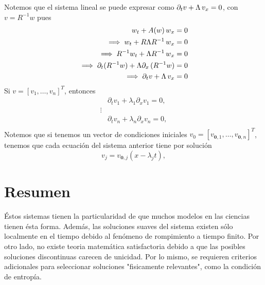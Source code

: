 Notemos que el sistema lineal se puede expresar como $\partial_t v + \Lambda \thinspace v_x = 0$, con $v = R^{-1} w$ pues
\begin{align*}
w_t + A(w) \thinspace w_x &= 0 \\
\implies w_t + R \Lambda R^{-1} \thinspace w_x &= 0 \\
\implies R^{-1} w_t + \Lambda R^{-1} \thinspace w_x &= 0 \\
\implies \partial_t(R^{-1} w) + \Lambda \partial_x \thinspace ( R^{-1} w) &= 0 \\
\implies \partial_t v + \Lambda \thinspace v_x &= 0
\end{align*}
Si $v = [v_1, \dots, v_n]^T $, entonces
\begin{align*}
&\partial_t v_1 + \lambda_1 \partial_x v_1 = 0, \\
\vdots \\
&\partial_t v_n + \lambda_n \partial_x v_n = 0, \\
\end{align*}
Notemos que si tenemos un vector de condiciones iniciales $v_0 = [v_{\textbf{0},1}, \dots, v_{\textbf{0},n}]^T$, tenemos que cada ecuación del sistema anterior tiene por solución
\[
v_j = v_{\textbf{0},j} (x - \lambda_j t),
\]


\section{Resumen}
Éstos sistemas tienen la particularidad de que muchos modelos en las ciencias tienen ésta forma. Además, las soluciones suaves del sistema existen sólo localmente en el tiempo debido al fenómeno de rompimiento a tiempo finito. Por otro lado, no existe teoria matemática satisfactoria debido a que las posibles soluciones discontinuas carecen de unicidad. Por lo mismo, se requieren criterios adicionales para seleccionar soluciones "fisicamente relevantes", como la condición de entropía.
